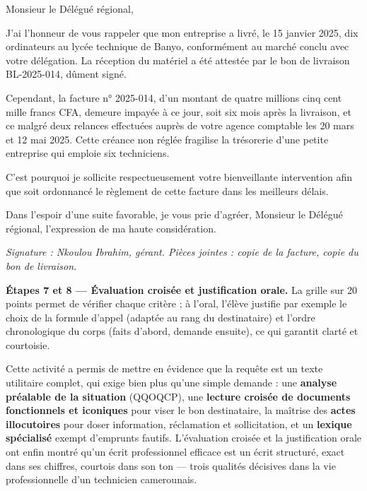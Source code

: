\documentclass[11pt]{article}
\newcounter{popsec}
\newcounter{popsub}
\newcommand{\courssub}[1]{%
  \stepcounter{popsub}%
  \par\vspace{9pt}\noindent{\popxbold\fontsize{11.5}{13}\selectfont\color{popink}{\color{poporange}\thepopsec.\thepopsub}\hspace{6pt}#1}\par\nopagebreak\vspace{4pt}
}
\begin{document}
\begin{exoresolu}
\og Monsieur le Délégué régional,

J'ai l'honneur de vous rappeler que mon entreprise a livré, le 15 janvier 2025, dix ordinateurs au lycée technique de Banyo, conformément au marché conclu avec votre délégation. La réception du matériel a été attestée par le bon de livraison BL-2025-014, dûment signé.

Cependant, la facture n° 2025-014, d'un montant de quatre millions cinq cent mille francs CFA, demeure impayée à ce jour, soit six mois après la livraison, et ce malgré deux relances effectuées auprès de votre agence comptable les 20 mars et 12 mai 2025. Cette créance non réglée fragilise la trésorerie d'une petite entreprise qui emploie six techniciens.

C'est pourquoi je sollicite respectueusement votre bienveillante intervention afin que soit ordonnancé le règlement de cette facture dans les meilleurs délais.

Dans l'espoir d'une suite favorable, je vous prie d'agréer, Monsieur le Délégué régional, l'expression de ma haute considération. \fg{}

\emph{Signature : Nkoulou Ibrahim, gérant. Pièces jointes : copie de la facture, copie du bon de livraison.}

\textbf{Étapes 7 et 8 — Évaluation croisée et justification orale.} La grille sur 20 points permet de vérifier chaque critère ; à l'oral, l'élève justifie par exemple le choix de la formule d'appel (adaptée au rang du destinataire) et l'ordre chronologique du corps (faits d'abord, demande ensuite), ce qui garantit clarté et courtoisie.
\end{exoresolu}

\courssub{Bilan de l'activité}

Cette activité a permis de mettre en évidence que la requête est un texte utilitaire complet, qui exige bien plus qu'une simple demande : une \textbf{analyse préalable de la situation} (QQOQCP), une \textbf{lecture croisée de documents fonctionnels et iconiques} pour viser le bon destinataire, la maîtrise des \textbf{actes illocutoires} pour doser information, réclamation et sollicitation, et un \textbf{lexique spécialisé} exempt d'emprunts fautifs. L'évaluation croisée et la justification orale ont enfin montré qu'un écrit professionnel efficace est un écrit structuré, exact dans ses chiffres, courtois dans son ton — trois qualités décisives dans la vie professionnelle d'un technicien camerounais.

\newpage
\end{document}

